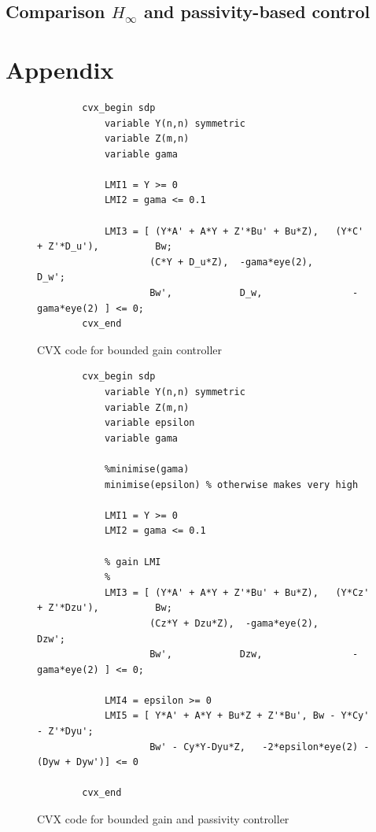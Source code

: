 \documentclass{article}
\begin{document}
\subsection{Comparison $H_\infty$ and passivity-based control}


\section{Appendix}


\begin{figure}[H]
    \centering
    \begin{lstlisting}
        cvx_begin sdp
            variable Y(n,n) symmetric
            variable Z(m,n)
            variable gama

            LMI1 = Y >= 0
            LMI2 = gama <= 0.1
            
            LMI3 = [ (Y*A' + A*Y + Z'*Bu' + Bu*Z),   (Y*C' + Z'*D_u'),          Bw;
                    (C*Y + D_u*Z),  -gama*eye(2),      D_w';
                    Bw',            D_w,                -gama*eye(2) ] <= 0;
        cvx_end
    \end{lstlisting}
    \caption{CVX code for bounded gain controller}
    \label{fig:bounded_lmi}
\end{figure}

\begin{figure}[H]
    \centering
    \begin{lstlisting}
        cvx_begin sdp
            variable Y(n,n) symmetric
            variable Z(m,n)
            variable epsilon
            variable gama
            
            %minimise(gama)
            minimise(epsilon) % otherwise makes very high

            LMI1 = Y >= 0
            LMI2 = gama <= 0.1
            
            % gain LMI
            %
            LMI3 = [ (Y*A' + A*Y + Z'*Bu' + Bu*Z),   (Y*Cz' + Z'*Dzu'),          Bw;
                    (Cz*Y + Dzu*Z),  -gama*eye(2),      Dzw';
                    Bw',            Dzw,                -gama*eye(2) ] <= 0;
            
            LMI4 = epsilon >= 0
            LMI5 = [ Y*A' + A*Y + Bu*Z + Z'*Bu', Bw - Y*Cy' - Z'*Dyu';
                    Bw' - Cy*Y-Dyu*Z,   -2*epsilon*eye(2) - (Dyw + Dyw')] <= 0
                
        cvx_end
    \end{lstlisting}
    \caption{CVX code for bounded gain and passivity controller}
    \label{fig:bounded_passive_lmi}
\end{figure}
\end{document}
